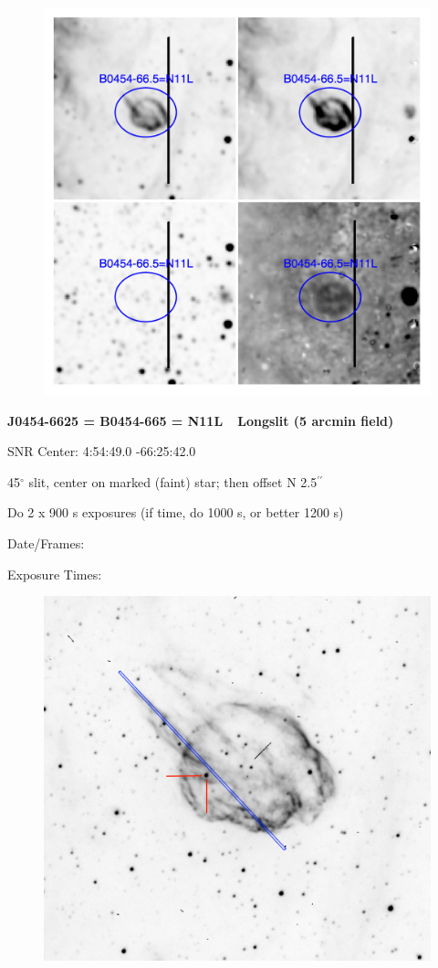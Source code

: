 \documentclass[11pt]{article}
\newcommand{\arcsec}{$^{\prime\prime}$}
\begin{document}
\begin{figure}
\includegraphics[width=12.5cm]{snapshots/N11L.png}
\end{figure}

\newpage
{\bf J0454-6625 = B0454-665 = N11L\ \ Longslit (5 arcmin field)}

SNR Center:   4:54:49.0   -66:25:42.0     

45$^\circ$ slit, center on marked (faint) star; then offset N 2.5\arcsec

Do 2 x 900 s exposures  (if time, do 1000 s, or better 1200 s)

Date/Frames:  

Exposure Times:  

\begin{figure}
\includegraphics[width=12.5cm]{snapshots/N11L_longslit.png}
\end{figure}
\end{document}
